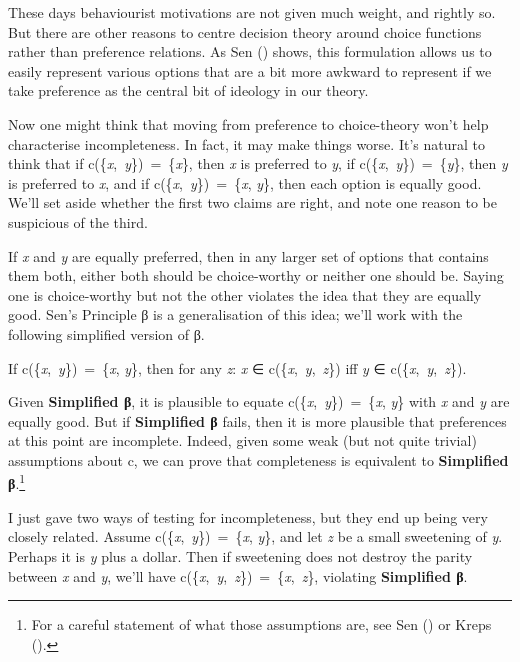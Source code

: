 \documentclass[
  11pt,
  letterpaper,
  DIV=11,
  numbers=noendperiod,
  twoside]{scrartcl}
\providecommand{\tightlist}{%
  \setlength{\itemsep}{0pt}\setlength{\parskip}{0pt}}
\begin{document}
These days behaviourist motivations are not given much weight, and
rightly so. But there are other reasons to centre decision theory around
choice functions rather than preference relations. As Sen
() shows, this formulation allows us to
easily represent various options that are a bit more awkward to
represent if we take preference as the central bit of ideology in our
theory.

Now one might think that moving from preference to choice-theory won't
help characterise incompleteness. In fact, it may make things worse.
It's natural to think that if c(\{\emph{x},~\emph{y}\})~=~\{\emph{x}\},
then \emph{x} is preferred to \emph{y}, if
c(\{\emph{x},~\emph{y}\})~=~\{\emph{y}\}, then \emph{y} is preferred to
\emph{x}, and if c(\{\emph{x},~\emph{y}\})~=~\{\emph{x}, \emph{y}\},
then each option is equally good. We'll set aside whether the first two
claims are right, and note one reason to be suspicious of the third.

If \emph{x} and \emph{y} are equally preferred, then in any larger set
of options that contains them both, either both should be choice-worthy
or neither one should be. Saying one is choice-worthy but not the other
violates the idea that they are equally good. Sen's Principle β is a
generalisation of this idea; we'll work with the following simplified
version of β.

\begin{description}
\tightlist
\item[Simplified β]
If c(\{\emph{x},~\emph{y}\})~=~\{\emph{x}, \emph{y}\}, then for any
\emph{z}: \emph{x} ∈ c(\{\emph{x},~\emph{y},~\emph{z}\}) iff \emph{y} ∈
c(\{\emph{x},~\emph{y},~\emph{z}\}).
\end{description}

Given \textbf{Simplified β}, it is plausible to equate
c(\{\emph{x},~\emph{y}\})~=~\{\emph{x}, \emph{y}\} with \emph{x} and
\emph{y} are equally good. But if \textbf{Simplified β} fails, then it
is more plausible that preferences at this point are incomplete. Indeed,
given some weak (but not quite trivial) assumptions about c, we can
prove that completeness is equivalent to \textbf{Simplified
β}.\footnote{For a careful statement of what those assumptions are, see
  Sen () or Kreps
  ().}

I just gave two ways of testing for incompleteness, but they end up
being very closely related. Assume
c(\{\emph{x},~\emph{y}\})~=~\{\emph{x}, \emph{y}\}, and let \emph{z} be
a small sweetening of \emph{y}. Perhaps it is \emph{y} plus a dollar.
Then if sweetening does not destroy the parity between \emph{x} and
\emph{y}, we'll have
c(\{\emph{x},~\emph{y},~\emph{z}\})~=~\{\emph{x},~\emph{z}\}, violating
\textbf{Simplified β}.
\end{document}
